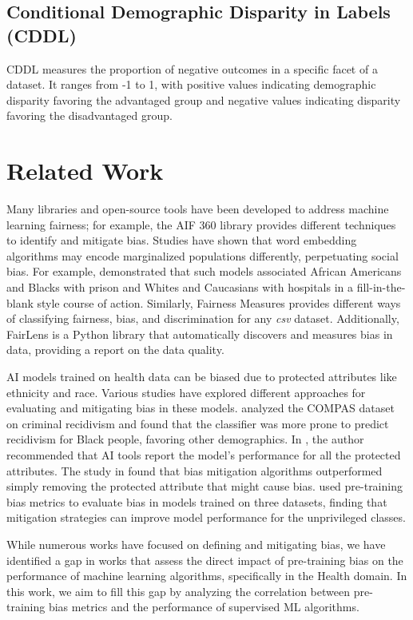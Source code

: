 \documentclass[12pt]{article}
\begin{document}
\subsection{Conditional Demographic Disparity in Labels (CDDL)}
CDDL measures the proportion of negative outcomes in a specific facet of a dataset. It ranges from -1 to 1, with positive values indicating demographic disparity favoring the advantaged group and negative values indicating disparity favoring the disadvantaged group.

\section{Related Work}
Many libraries and open-source tools have been developed to address machine learning fairness; for example, the AIF 360 library \cite{Bellamy2018} provides different techniques to identify and mitigate bias. Studies have shown that word embedding algorithms may encode marginalized populations differently, perpetuating social bias. For example, \cite{Zhang2020} demonstrated that such models associated African Americans and Blacks with prison and Whites and Caucasians with hospitals in a fill-in-the-blank style course of action. 
Similarly, Fairness Measures \cite{Zehlike2017} provides different ways of classifying fairness, bias, and discrimination for any \textit{csv} dataset.
Additionally, FairLens \cite{fairlens} is a Python library that automatically discovers and measures bias in data, providing a report on the data quality.

AI models trained on health data can be biased due to protected attributes like ethnicity and race. 
Various studies have explored different approaches for evaluating and mitigating bias in these models. 
\cite {Lopes} analyzed the COMPAS dataset on criminal recidivism and found that the classifier was more prone to predict recidivism for Black people, favoring other demographics. 
In \cite{Noseworthy2020}, the author recommended that AI tools report the model's performance for all the protected attributes.
The study in \cite{Park2021} found that bias mitigation algorithms outperformed simply removing the protected attribute that might cause bias.
\cite{Mandhala2022} used pre-training bias metrics to evaluate bias in models trained on three datasets, finding that mitigation strategies can improve model performance for the unprivileged classes. 

While numerous works have focused on defining and mitigating bias, we have identified a gap in works that assess the direct impact of pre-training bias on the performance of machine learning algorithms, specifically in the Health domain. In this work, we aim to fill this gap by analyzing the correlation between pre-training bias metrics and the performance of supervised ML algorithms. 
\end{document}
